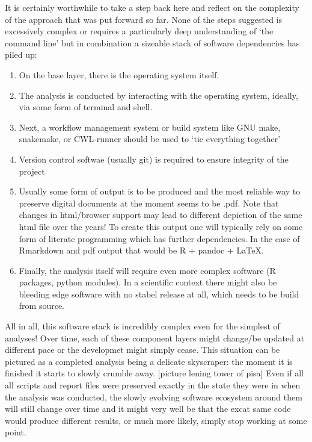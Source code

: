 \documentclass[]{book}
\providecommand{\tightlist}{%
  \setlength{\itemsep}{0pt}\setlength{\parskip}{0pt}}
\begin{document}
It is certainly worthwhile to take a step back here and reflect on the
complexity of the approach that was put forward so far. None of the
steps suggested is excessively complex or requires a particularly deep
understanding of `the command line' but in combination a sizeable stack
of software dependencies has piled up:

\begin{enumerate}
\def\labelenumi{\arabic{enumi}.}
\tightlist
\item
  On the base layer, there is the operating system itself.
\item
  The analysis is conducted by interacting with the operating system,
  ideally, via some form of terminal and shell.
\item
  Next, a workflow management system or build system like GNU make,
  snakemake, or CWL-runner should be used to `tie everything together'
\item
  Version control softwae (usually git) is required to ensure integrity
  of the project
\item
  Usually some form of output is to be produced and the most reliable
  way to preserve digital documents at the moment seems to be .pdf. Note
  that changes in html/browser support may lead to different depiction
  of the same html file over the years! To create this output one will
  typically rely on some form of literate programming which has further
  dependencies. In the case of Rmarkdown and pdf output that would be R
  + pandoc + LaTeX.
\item
  Finally, the analysis itself will require even more complex software
  (R packages, python modules). In a scientific context there might also
  be bleeding edge software with no stabel release at all, which needs
  to be build from source.
\end{enumerate}

All in all, this software stack is incredibly complex even for the
simplest of analyses! Over time, each of these component layers might
change/be updated at different pace or the developmet might simply
cease. This situation can be pictured as a completed analysis being a
delicate skyscraper: the moment it is finished it starts to slowly
crumble away. {[}picture lening tower of pisa{]} Even if all all scripts
and report files were preserved exactly in the state they were in when
the analysis was conducted, the slowly evolving software ecosystem
around them will still change over time and it might very well be that
the excat same code would produce different results, or much more
likely, simply stop working at some point.
\end{document}
